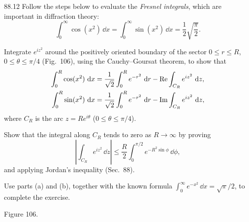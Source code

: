 \documentclass[11pt,oneside]{article}
\begin{document}
\begin{exercise}{88.12}
Follow the steps below to evaluate the \emph{Fresnel integrals}, which are important in diffraction theory:
\[
    \int_0^\infty\cos(x^2)\,\dd x
    =\int_0^\infty\sin(x^2)\,\dd x
    =\frac12\sqrt{\frac\pi2}.
\]
\begin{exercisesubparts}
    \item Integrate $e^{iz^2}$ around the positively oriented boundary of the sector $0\le r\le R$, $0\le\theta\le\pi/4$ (Fig.~106), using the Cauchy--Goursat theorem, to show that
    \[
    \begin{aligned}
        \int_0^R\cos(x^2)\,\mathop{}\!\mathrm{d} x
        &=\frac1{\sqrt2}\int_0^R e^{-r^2}\,\mathop{}\!\mathrm{d} r
          -\operatorname{Re}\int_{C_R}e^{iz^2}\,\mathop{}\!\mathrm{d} z,\\
        \int_0^R\sin(x^2)\,\mathop{}\!\mathrm{d} x
        &=\frac1{\sqrt2}\int_0^R e^{-r^2}\,\mathop{}\!\mathrm{d} r
          -\operatorname{Im}\int_{C_R}e^{iz^2}\,\mathop{}\!\mathrm{d} z,
    \end{aligned}
    \]
    where $C_R$ is the arc $z=Re^{i\theta}$ ($0\le\theta\le\pi/4$).

    \item Show that the integral along $C_R$ tends to zero as $R\to\infty$ by proving
    \[
        \left|\int_{C_R}e^{iz^2}\,\dd z\right|
        \le\frac R2\int_0^{\pi/2}e^{-R^2\sin\phi}\,\dd\phi,
    \]
    and applying Jordan's inequality (Sec.~88).

    \item Use parts (a) and (b), together with the known formula $\int_0^\infty e^{-x^2}\,\dd x=\sqrt\pi/2$, to complete the exercise.
\end{exercisesubparts}
\begin{center}
\par\small Figure 106.
\end{center}
\end{exercise}
\end{document}
